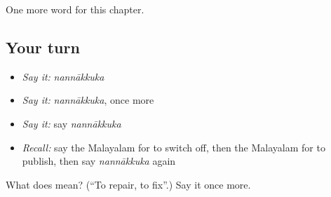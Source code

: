 \begin{grammarlens}[title={What you've built}]
One more word for this chapter.
\end{grammarlens}

\subsection*{Your turn}
\begin{itemize}
\raggedright
  \item \emph{Say it:} \emph{nannākkuka}
  \item \emph{Say it:} \emph{nannākkuka}, once more
  \item \emph{Say it:} say \emph{nannākkuka}
  \item \emph{Recall:} say the Malayalam for to switch off, then the Malayalam for to publish, then say \emph{nannākkuka} again
\end{itemize}

\begin{tcolorbox}[breakable,colback=teal!4,colframe=teal!35!black,title={Before you move on}]
What does  mean? (\textquotedblleft{}To repair, to fix\textquotedblright{}.) Say it once more.
\end{tcolorbox}

